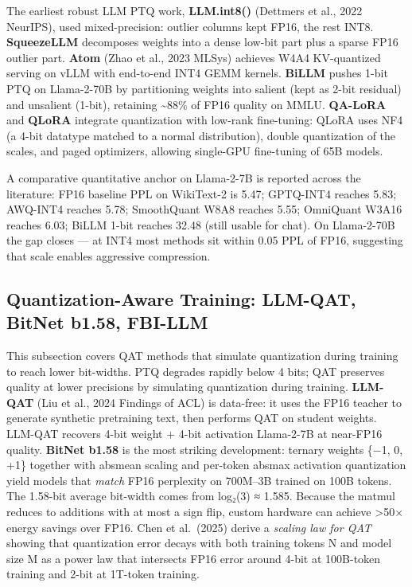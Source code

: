 \documentclass{article}
\begin{document}
The earliest robust LLM PTQ work, \textbf{LLM.int8()} (Dettmers et al., 2022 NeurIPS), used mixed-precision: outlier columns kept FP16, the rest INT8. \textbf{SqueezeLLM} \citep{kim20232023} decomposes weights into a dense low-bit part plus a sparse FP16 outlier part. \textbf{Atom} (Zhao et al., 2023 MLSys) achieves W4A4 KV-quantized serving on vLLM with end-to-end INT4 GEMM kernels. \textbf{BiLLM} \citep{huang20242024} pushes 1-bit PTQ on Llama-2-70B by partitioning weights into salient (kept as 2-bit residual) and unsalient (1-bit), retaining \textasciitilde88\% of FP16 quality on MMLU. \textbf{QA-LoRA} \citep{xu20242024} and \textbf{QLoRA} \citep{dettmers2023qloraefficientfine} integrate quantization with low-rank fine-tuning: QLoRA uses NF4 (a 4-bit datatype matched to a normal distribution), double quantization of the scales, and paged optimizers, allowing single-GPU fine-tuning of 65B models.

A comparative quantitative anchor on Llama-2-7B is reported across the literature: FP16 baseline PPL on WikiText-2 is 5.47; GPTQ-INT4 reaches 5.83; AWQ-INT4 reaches 5.78; SmoothQuant W8A8 reaches 5.55; OmniQuant W3A16 reaches 6.03; BiLLM 1-bit reaches 32.48 (still usable for chat). On Llama-2-70B the gap closes --- at INT4 most methods sit within 0.05 PPL of FP16, suggesting that scale enables aggressive compression.

\subsection{Quantization-Aware Training: LLM-QAT, BitNet b1.58, FBI-LLM}\label{quantization-aware-training-llm-qat-bitnet-b1.58-fbi-llm}

This subsection covers QAT methods that simulate quantization during training to reach lower bit-widths. PTQ degrades rapidly below 4 bits; QAT preserves quality at lower precisions by simulating quantization during training. \textbf{LLM-QAT} (Liu et al., 2024 Findings of ACL) is data-free: it uses the FP16 teacher to generate synthetic pretraining text, then performs QAT on student weights. LLM-QAT recovers 4-bit weight + 4-bit activation Llama-2-7B at near-FP16 quality. \textbf{BitNet b1.58} \citep{ma20242024} is the most striking development: ternary weights \{−1, 0, +1\} together with absmean scaling and per-token absmax activation quantization yield models that \emph{match} FP16 perplexity on 700M--3B trained on 100B tokens. The 1.58-bit average bit-width comes from log₂(3) ≈ 1.585. Because the matmul reduces to additions with at most a sign flip, custom hardware can achieve \textgreater50× energy savings over FP16. Chen et al.~(2025) derive a \emph{scaling law for QAT} showing that quantization error decays with both training tokens N and model size M as a power law that intersects FP16 error around 4-bit at 100B-token training and 2-bit at 1T-token training.
\end{document}

